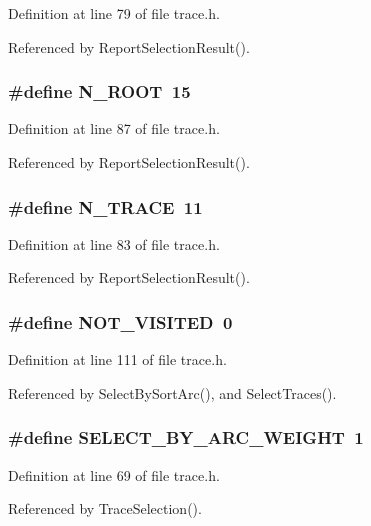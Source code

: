 Definition at line 79 of file trace.h.

Referenced by Report\-Selection\-Result().
\subsubsection{\setlength{\rightskip}{0pt plus 5cm}\#define N\_\-ROOT~15}\label{trace_8h_9011282fb977328bdebf2b5db596cf5f}




Definition at line 87 of file trace.h.

Referenced by Report\-Selection\-Result().
\subsubsection{\setlength{\rightskip}{0pt plus 5cm}\#define N\_\-TRACE~11}\label{trace_8h_e85b18db854311cf6557d325a4624dc2}




Definition at line 83 of file trace.h.

Referenced by Report\-Selection\-Result().
\subsubsection{\setlength{\rightskip}{0pt plus 5cm}\#define NOT\_\-VISITED~0}\label{trace_8h_5e4872adf233dfb73827cdb4a8bcb9fe}




Definition at line 111 of file trace.h.

Referenced by Select\-By\-Sort\-Arc(), and Select\-Traces().
\subsubsection{\setlength{\rightskip}{0pt plus 5cm}\#define SELECT\_\-BY\_\-ARC\_\-WEIGHT~1}\label{trace_8h_bf47a760a7099376d2a95d1db0e33edd}




Definition at line 69 of file trace.h.

Referenced by Trace\-Selection().

